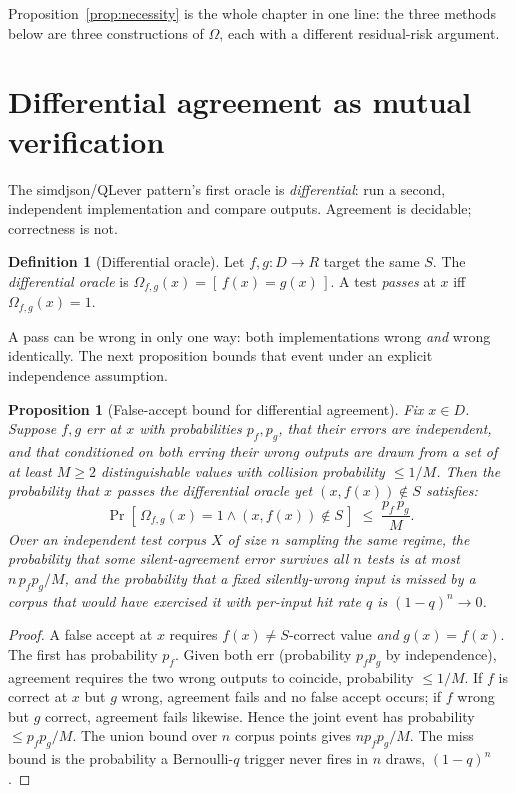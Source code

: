 \documentclass[11pt,oneside]{book}
\theoremstyle{definition}
\newtheorem{definition}{Definition}[chapter]
\theoremstyle{plain}
\newtheorem{proposition}[theorem]{Proposition}
\theoremstyle{remark}
\begin{document}
Proposition~\ref{prop:necessity} is the whole chapter in one line: the three methods below are three constructions of $\Omega$, each with a different residual-risk argument. %

\section{Differential agreement as mutual verification}
The simdjson/QLever pattern's first oracle is \emph{differential}: run a second, independent implementation and compare outputs. %
Agreement is decidable; correctness is not. %

\begin{definition}[Differential oracle]\label{def:diff}
Let $f,g:D\to R$ target the same $S$. %
The \emph{differential oracle} is $\Omega_{f,g}(x)=[\,f(x)=g(x)\,]$. %
A test \emph{passes} at $x$ iff $\Omega_{f,g}(x)=1$. %
\end{definition}

A pass can be wrong in only one way: both implementations wrong \emph{and} wrong identically. %
The next proposition bounds that event under an explicit independence assumption. %

\begin{proposition}[False-accept bound for differential agreement]\label{prop:diff-bound}
Fix $x\in D$. %
Suppose $f,g$ err at $x$ with probabilities $p_f,p_g$, that their errors are independent, and that conditioned on both erring their wrong outputs are drawn from a set of at least $M\ge 2$ distinguishable values with collision probability $\le 1/M$. %
Then the probability that $x$ passes the differential oracle yet $(x,f(x))\notin S$ satisfies:
\[
\Pr[\,\Omega_{f,g}(x)=1 \wedge (x,f(x))\notin S\,]\;\le\;\frac{p_f\,p_g}{M}.
\]
Over an independent test corpus $X$ of size $n$ sampling the same regime, the probability that some silent-agreement error survives all $n$ tests is at most $n\,p_f p_g/M$, and the probability that a \emph{fixed} silently-wrong input is missed by a corpus that would have exercised it with per-input hit rate $q$ is $(1-q)^{n}\to 0$. %
\end{proposition}

\begin{proof}
A false accept at $x$ requires $f(x)\ne S$-correct value \emph{and} $g(x)=f(x)$. %
The first has probability $p_f$. %
Given both err (probability $p_f p_g$ by independence), agreement requires the two wrong outputs to coincide, probability $\le 1/M$. %
If $f$ is correct at $x$ but $g$ wrong, agreement fails and no false accept occurs; if $f$ wrong but $g$ correct, agreement fails likewise. %
Hence the joint event has probability $\le p_f p_g/M$. %
The union bound over $n$ corpus points gives $n p_f p_g/M$. %
The miss bound is the probability a Bernoulli-$q$ trigger never fires in $n$ draws, $(1-q)^n$. %
\end{proof}
\end{document}
